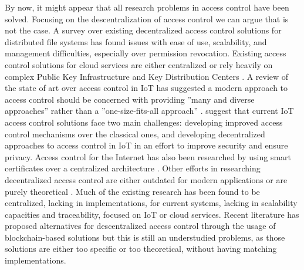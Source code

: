 By now, it might appear that all research problems in access control have been solved. Focusing on the descentralization of access control we can argue that is not the case. A survey over existing decentralized access control solutions \cite{miltchev_decentralized_2008} for distributed file systems has found issues with ease of use, scalability, and management difficulties, especially over permission revocation. Existing access control solutions for cloud services are either centralized \cite{calero_toward_2010, ruj_dacc:_2011, yu_achieving_2010} or rely heavily on complex Public Key Infrastructure and Key Distribution Centers \cite{ruj_privacy_2012, ruj_decentralized_2014,bauer_distributed_2005}. A review of the state of art over access control in IoT \cite{ouaddah_access_2017} has suggested a modern approach to access control should be concerned with providing ”many and diverse approaches” \cite[242]{ouaddah_access_2017} rather than a ”one-size-fits-all approach” \cite[242]{ouaddah_access_2017}. \citeauthor{ouaddah_access_2017} suggest that current IoT access control solutions face two main challenges: developing improved access control mechanisms over the classical ones, and developing decentralized approaches to access control in IoT in an effort to improve security and ensure privacy. Access control for the Internet has also been researched by using smart certificates over a centralized architecture \cite{park_smart_1999}. Other efforts in researching decentralized access control are either outdated for modern applications \cite{satyanarayanan_integrating_1989, karger_non-discretionary_1977} or are purely theoretical \cite{thomas_towards_1993}. Much of the existing research has been found to be centralized, lacking in implementations, for current systems, lacking in scalability capacities and traceability, focused on IoT or cloud services. Recent literature has proposed alternatives for descentralized access control through the usage of blockchain-based solutions but this is still an understudied problems, as those solutions are either too specific or too theoretical, without having matching implementations.

